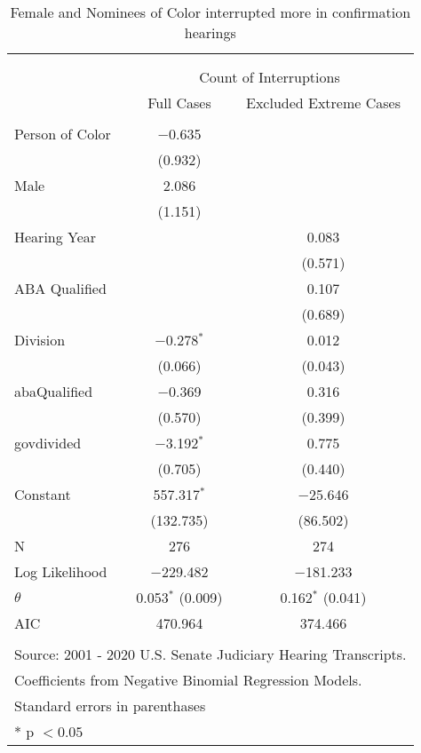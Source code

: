 
\begin{table}[!htbp] \centering 
  \caption{Female and Nominees of Color interrupted more in confirmation hearings} 
  \label{} 
\begin{tabular}{@{\extracolsep{5pt}}lcc} 
\\[-1.8ex]\hline \\[-1.8ex] 
\\[-1.8ex] & \multicolumn{2}{c}{Count of Interruptions} \\ 
 & Full Cases & Excluded Extreme Cases \\ 
\hline \\[-1.8ex] 
 Person of Color & $-$0.635 &  \\ 
  & (0.932) &  \\ 
  Male & 2.086 &  \\ 
  & (1.151) &  \\ 
  Hearing Year &  & 0.083 \\ 
  &  & (0.571) \\ 
  ABA Qualified &  & 0.107 \\ 
  &  & (0.689) \\ 
  Division & $-$0.278$^{*}$ & 0.012 \\ 
  & (0.066) & (0.043) \\ 
  abaQualified & $-$0.369 & 0.316 \\ 
  & (0.570) & (0.399) \\ 
  govdivided & $-$3.192$^{*}$ & 0.775 \\ 
  & (0.705) & (0.440) \\ 
  Constant & 557.317$^{*}$ & $-$25.646 \\ 
  & (132.735) & (86.502) \\ 
 N & 276 & 274 \\ 
Log Likelihood & $-$229.482 & $-$181.233 \\ 
$\theta$ & 0.053$^{*}$  (0.009) & 0.162$^{*}$  (0.041) \\ 
AIC & 470.964 & 374.466 \\ 
\hline \\[-1.8ex] 
\multicolumn{3}{l}{Source: 2001 - 2020 U.S. Senate Judiciary Hearing Transcripts.} \\ 
\multicolumn{3}{l}{Coefficients from Negative Binomial Regression Models.} \\ 
\multicolumn{3}{l}{Standard errors in parenthases} \\ 
\multicolumn{3}{l}{* p $<0.05$} \\ 
\end{tabular} 
\end{table} 

